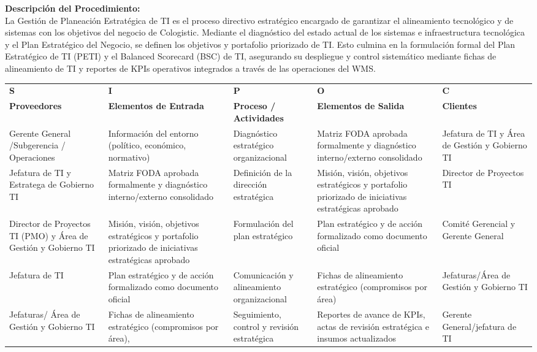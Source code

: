 \documentclass[11pt,letterpaper]{report}
\begin{document}
\textbf{Descripción del Procedimiento:} \\
La Gestión de Planeación Estratégica de TI es el proceso directivo estratégico encargado de garantizar el alineamiento tecnológico y de sistemas con los objetivos del negocio de Cologistic. Mediante el diagnóstico del estado actual de los sistemas e infraestructura tecnológica y el Plan Estratégico del Negocio, se definen los objetivos y portafolio priorizado de TI. Esto culmina en la formulación formal del Plan Estratégico de TI (PETI) y el Balanced Scorecard (BSC) de TI, asegurando su despliegue y control sistemático mediante fichas de alineamiento de TI y reportes de KPIs operativos integrados a través de las operaciones del WMS.



\begin{center}
  \small
  \begin{tabularx}{\textwidth}{>{\raggedright\arraybackslash}p{} >{\raggedright\arraybackslash}p{} >{\raggedright\arraybackslash}X >{\raggedright\arraybackslash}p{} >{\raggedright\arraybackslash}p{}}
  \toprule
  \textbf{S} & \textbf{I} & \textbf{P} & \textbf{O} & \textbf{C} \\
  \textbf{Proveedores} & \textbf{Elementos de Entrada} & \textbf{Proceso / Actividades} & \textbf{Elementos de Salida} & \textbf{Clientes} \\
  \midrule
  Gerente General /Subgerencia / Operaciones & Información del entorno (político, económico, normativo) & Diagnóstico estratégico organizacional & Matriz FODA aprobada formalmente y diagnóstico interno/externo consolidado & Jefatura de TI y Área de Gestión y Gobierno TI \\
  \midrule
  Jefatura de TI y Estratega de Gobierno TI & Matriz FODA aprobada formalmente y diagnóstico interno/externo consolidado & Definición de la dirección estratégica & Misión, visión, objetivos estratégicos y portafolio priorizado de iniciativas estratégicas aprobado & Director de Proyectos TI \\
  \midrule
  Director de Proyectos TI (PMO) y Área de Gestión y Gobierno TI & Misión, visión, objetivos estratégicos y portafolio priorizado de iniciativas estratégicas aprobado & Formulación del plan estratégico & Plan estratégico y de acción formalizado como documento oficial & Comité Gerencial y Gerente General \\
  \midrule
  Jefatura de TI & Plan estratégico y de acción formalizado como documento oficial & Comunicación y alineamiento organizacional & Fichas de alineamiento estratégico (compromisos por área) & Jefaturas/Área de Gestión y Gobierno TI \\
  \midrule
  Jefaturas/ Área de Gestión y Gobierno TI & Fichas de alineamiento estratégico (compromisos por área), & Seguimiento, control y revisión estratégica & Reportes de avance de KPIs, actas de revisión estratégica e insumos actualizados & Gerente General/jefatura de TI \\
  \bottomrule
  \end{tabularx}
\end{center}
\end{document}

